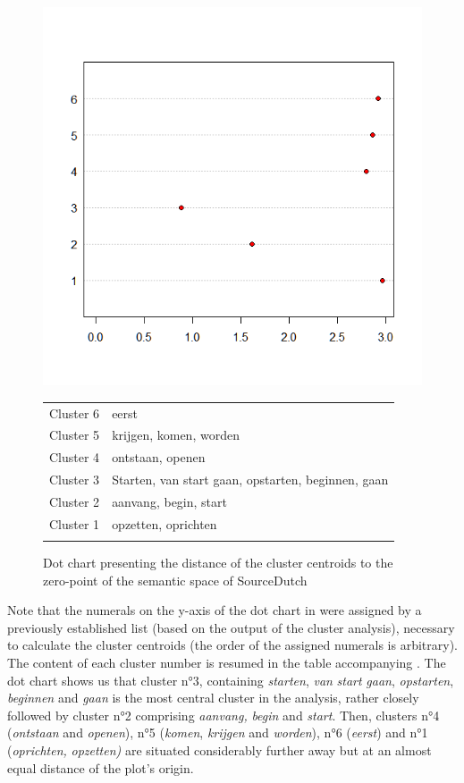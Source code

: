 \begin{figure} 
\includegraphics[height=.4\textheight]{figures/Vandevoorde2-img55.png}
\scriptsize
\begin{tabular}{ll}
\lsptoprule
Cluster 6 & eerst\\
Cluster 5 & krijgen, komen, worden\\
Cluster 4 & ontstaan, openen\\
Cluster 3 & Starten, van start gaan, opstarten, beginnen, gaan\\
Cluster 2 & aanvang, begin, start\\
Cluster 1 & opzetten, oprichten\\
\lspbottomrule
\end{tabular}
\normalsize
\caption{\label{fig:4:55}  Dot chart presenting the distance of the cluster centroids to the zero-point of the semantic space of SourceDutch}
\end{figure}

Note that the numerals on the y-axis of the dot chart in  were assigned by a previously established list (based on the output of the cluster analysis), necessary to calculate the cluster centroids (the order of the assigned numerals is arbitrary). The content of each cluster number is resumed in the table accompanying . The dot chart shows us that cluster n°3, containing \textit{starten}, \textit{van} \textit{start} \textit{gaan}, \textit{opstarten}, \textit{beginnen} and \textit{gaan} is the most central cluster in the analysis, rather closely followed by cluster n°2 comprising \textit{aanvang,} \textit{begin} and \textit{start}. Then, clusters n°4 (\textit{ontstaan} and \textit{openen}), n°5 (\textit{komen}, \textit{krijgen} and \textit{worden}), n°6 (\textit{eerst}) and n°1 (\textit{oprichten,} \textit{opzetten)} are situated considerably further away but at an almost equal distance of the plot’s origin.

